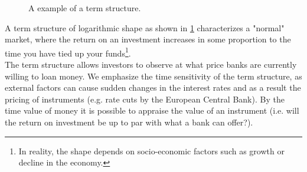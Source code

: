 \begin{figure}[h!]
\begin{center}
\caption{A example of a term structure.}
\label{fig:anc}
\end{center}
\end{figure}

A term structure of logarithmic shape as shown in \ref{fig:anc} characterizes a
"normal" market, where the return on an investment increases in some proportion
to the time you have tied up your funds\footnote{In reality, the shape depends on 
socio-economic factors such as growth or decline in the economy.}.\\

The term structure allows investors to observe at what price banks are
currently willing to loan money. We emphasize the time sensitivity of the term
structure, as external factors can cause sudden changes in the interest
rates and as a result the pricing of instruments (e.g. rate cuts by the
European Central Bank). By the time value of money it is possible to
appraise the value of an instrument (i.e. will the return on investment
be up to par with what a bank can offer?).\\

